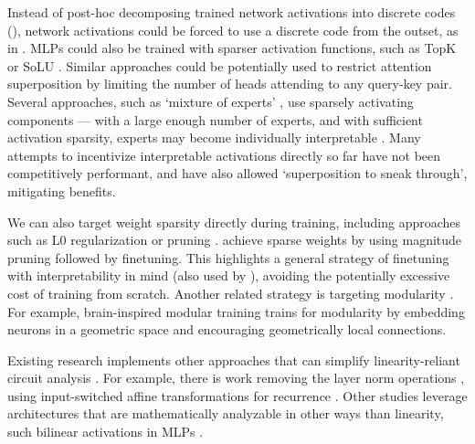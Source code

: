 Instead of post-hoc decomposing trained network activations into discrete codes (), network activations could be forced to use a discrete code from the outset, as in \citet{tamkin2023codebookfeaturessparsediscrete}. MLPs could also be trained with sparser activation functions, such as TopK \citep{makhzani2013ksparseautoencoders,bills2023language} or SoLU \citep{elhage2022solu}. Similar approaches could be potentially used to restrict attention superposition \citep{jermyn2023attention} by limiting the number of heads attending to any query-key pair. Several approaches, such as `mixture of experts' \citep{shazeer2017outrageouslylargeneuralnetworks,switchtransformers, he2024mixturemillionexperts}, use sparsely activating components — with a large enough number of experts, and with sufficient activation sparsity, experts may become individually interpretable \citep{warstadt2019neuralnetworkacceptabilityjudgments}. Many attempts to incentivize interpretable activations directly so far have not been competitively performant, and have also allowed `superposition to sneak through', mitigating benefits.

We can also target weight sparsity directly during training, including approaches such as L0 regularization \citep{louizos2018learningsparseneuralnetworks} or pruning \citep{Mozer_1988_skeletonization,frankle2019lotterytickethypothesisfinding, mocanu2018scalable}. \citet{Han_2015_weightsandconnections} achieve sparse weights by using magnitude pruning followed by finetuning. This highlights a general strategy of finetuning with interpretability in mind (also used by \citet{tamkin2023codebookfeaturessparsediscrete}), avoiding the potentially excessive cost of training from scratch. Another related strategy is targeting modularity \citep{Kirsch_2018_modularnetworks, andreas2017neuralmodulenetworks}. For example, brain-inspired modular training \citep{liu2023seeingbelievingbraininspiredmodular} trains for modularity by embedding neurons in a geometric space and encouraging geometrically local connections.

Existing research implements other approaches that can simplify linearity-reliant circuit analysis \citep{elhage2021mathematical}. For example, there is work removing the layer norm operations \citep{heimersheim2024removegpt2slayernormfinetuning}, using input-switched affine transformations for recurrence \citep{foerster2017inputswitchedaffinenetworks}. Other studies leverage architectures that are mathematically analyzable in other ways than linearity, such bilinear activations in MLPs \citep{sharkey2023technicalnotebilinearlayers, pearce2024weightbaseddecompositioncasebilinear}.

